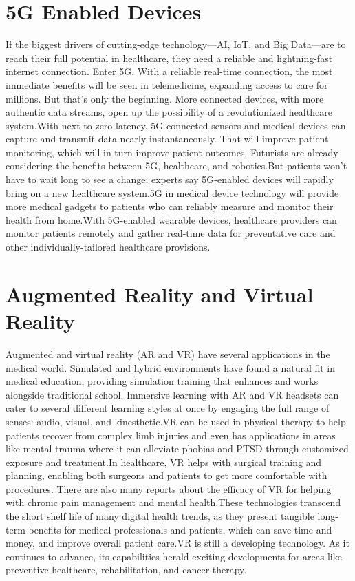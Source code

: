 \documentclass{article}[A4,12pt]
\begin{document}
\section{5G Enabled Devices}
If the biggest drivers of cutting-edge technology—AI, IoT, and Big Data—are to reach their full potential in healthcare, they need a reliable and lightning-fast internet connection. Enter 5G. With a reliable real-time connection, the most immediate benefits will be seen in telemedicine, expanding access to care for millions. But that’s only the beginning. More connected devices, with more authentic data streams, open up the possibility of a revolutionized healthcare system.With next-to-zero latency, 5G-connected sensors and medical devices can capture and transmit data nearly instantaneously. That will improve patient monitoring, which will in turn improve patient outcomes. Futurists are already considering the benefits between 5G, healthcare, and robotics.But patients won’t have to wait long to see a change: experts say 5G-enabled devices will rapidly bring on a new healthcare system.5G in medical device technology will provide more medical gadgets to patients who can reliably measure and monitor their health from home.With 5G-enabled wearable devices, healthcare providers can monitor patients remotely and gather real-time data for preventative care and other individually-tailored healthcare provisions.


\section{Augmented Reality and Virtual Reality}
Augmented and virtual reality (AR and VR) have several applications in the medical world. Simulated and hybrid environments have found a natural fit in medical education, providing simulation training that enhances and works alongside traditional school. Immersive learning with AR and VR headsets can cater to several different learning styles at once by engaging the full range of senses: audio, visual, and kinesthetic.VR can be used in physical therapy to help patients recover from complex limb injuries and even has applications in areas like mental trauma where it can alleviate phobias and PTSD through customized exposure and treatment.In healthcare, VR helps with surgical training and planning, enabling both surgeons and patients to get more comfortable with procedures. There are also many reports about the efficacy of VR for helping with chronic pain management and mental health.These technologies transcend the short shelf life of many digital health trends, as they present tangible long-term benefits for medical professionals and patients, which can save time and money, and improve overall patient care.VR is still a developing technology. As it continues to advance, its capabilities herald exciting developments for areas like preventive healthcare, rehabilitation, and cancer therapy.
\end{document}
